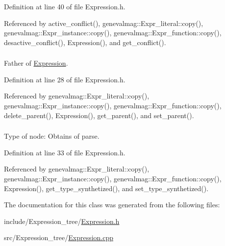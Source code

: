 Definition at line 40 of file Expression.h.

Referenced by active\_\-conflict(), genevalmag::Expr\_\-literal::copy(), genevalmag::Expr\_\-instance::copy(), genevalmag::Expr\_\-function::copy(), desactive\_\-conflict(), Expression(), and get\_\-conflict().\hypertarget{classgenevalmag_1_1Expression_2de0ee2801347dfd9e7b8a3a99d93233}{
\subsubsection[{parent}]{}}
\label{classgenevalmag_1_1Expression_2de0ee2801347dfd9e7b8a3a99d93233}


Father of \hyperlink{classgenevalmag_1_1Expression}{Expression}. 



Definition at line 28 of file Expression.h.

Referenced by genevalmag::Expr\_\-literal::copy(), genevalmag::Expr\_\-instance::copy(), genevalmag::Expr\_\-function::copy(), delete\_\-parent(), Expression(), get\_\-parent(), and set\_\-parent().\hypertarget{classgenevalmag_1_1Expression_449dcb5bce7eb0d3c61ef6d468e6460b}{
\subsubsection[{type\_\-synthetized}]{}}
\label{classgenevalmag_1_1Expression_449dcb5bce7eb0d3c61ef6d468e6460b}


Type of node: Obtains of parse. 



Definition at line 33 of file Expression.h.

Referenced by genevalmag::Expr\_\-literal::copy(), genevalmag::Expr\_\-instance::copy(), genevalmag::Expr\_\-function::copy(), Expression(), get\_\-type\_\-synthetized(), and set\_\-type\_\-synthetized().

The documentation for this class was generated from the following files:\begin{CompactItemize}
\item 
include/Expression\_\-tree/\hyperlink{Expression_8h}{Expression.h}\item 
src/Expression\_\-tree/\hyperlink{Expression_8cpp}{Expression.cpp}\end{CompactItemize}
